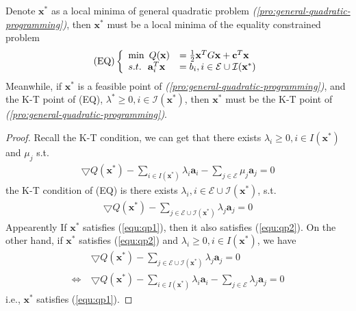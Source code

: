 \begin{theorem}
    Denote $\mathbf{x}^*$ as a local minima of general quadratic
    problem \emph{(\ref{pro:general-quadratic-programming})}, then $\mathbf{x}^*$ must be a local minima of
    the equality constrained problem
    \begin{align}
        (\textnormal{EQ})\left\{
            \begin{array}{ll}
                \min \ Q(\mathbf{x}) &= \frac{1}{2} \mathbf{x}^T G\mathbf{x}
                + \mathbf{c}^T\mathbf{x} \\
                s.t. \ \ \mathbf{a}_i^T\mathbf{x} &= b_i, i \in \mathcal{E}
                \cup \mathcal{I}(\mathbf{x}^*)
            \end{array}
        \right.
    \end{align}
    Meanwhile, if $\mathbf{x}^*$ is a feasible point of \emph{(\ref{pro:general-quadratic-programming})},
    and the K-T point of (EQ), $\lambda^* \geq 0, i \in \mathcal{I}(\mathbf{x}^*)$,
    then $\mathbf{x}^*$ must be the K-T point of \emph{(\ref{pro:general-quadratic-programming})}.
\end{theorem}
\begin{proof}
    Recall the K-T condition, we can get that
    there exists $\lambda_i \geq 0, i \in I(\mathbf{x}^*)$ and $\mu_j$ s.t.
    \begin{align}
        \bigtriangledown Q(\mathbf{x}^*) - \sum_{i\in I(\mathbf{x}^*)} \lambda_i \mathbf{a}_i
        - \sum_{j \in \mathcal{E}} \mu_j \mathbf{a}_j = 0
        \label{equ:qp1}
    \end{align}
    the K-T condition of (EQ) is there exists $\lambda_i, i \in \mathcal{E} \cup \mathcal{I}(\mathbf{x}^*)$,
    s.t.
    \begin{align}
        \bigtriangledown Q(\mathbf{x}^*)
        - \sum_{j \in \mathcal{E} \cup \mathcal{I}(\mathbf{x}^*)} \lambda_j \mathbf{a}_j = 0
        \label{equ:qp2}
    \end{align}
    Appearently If $\mathbf{x}^*$ satisfies (\ref{equ:qp1}), then it also satisfies (\ref{equ:qp2}).
    On the other hand, if $\mathbf{x}^*$ satisfies (\ref{equ:qp2}) and $\lambda_i \geq 0, i \in I(\mathbf{x}^*)$,
    we have
    \begin{align}
        &\bigtriangledown Q(\mathbf{x}^*)
        - \sum_{j \in \mathcal{E} \cup \mathcal{I}(\mathbf{x}^*)} \lambda_j \mathbf{a}_j = 0 \\
        \Leftrightarrow \ &
        \bigtriangledown Q(\mathbf{x}^*) - \sum_{i\in I(\mathbf{x}^*)} \lambda_i \mathbf{a}_i
        - \sum_{j \in \mathcal{E}} \lambda_j \mathbf{a}_j = 0
    \end{align}
    i.e., $\mathbf{x}^*$ satisfies (\ref{equ:qp1}).
    
\end{proof}

